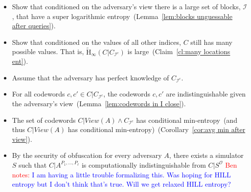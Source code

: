 \documentclass[11pt]{article}
\newcommand{\corref}[1]{\mbox{Corollary~\ref{#1}}}
\newcommand{\lemref}[1]{\mbox{Lemma~\ref{#1}}}
\newcommand{\clref}[1]{\mbox{Claim~\ref{#1}}}
\newcommand{\Hav}{\tilde{\mathrm{H}}_\infty}
\newcommand{\authnote}[2]{{\textcolor{red}{\textsf{#1 notes: }\textcolor{blue}{ #2}}\marginpar{\textcolor{red}{\textbf{!!!!!}}}}}
\newcommand{\authnote}[2]{}
\newcommand{\bnote}[1]{{\authnote{Ben}{#1}}}
\begin{document}
\begin{itemize}
\item Show that conditioned on the adversary's view there is a large set of blocks, $\mathcal{I}$, that have a super logarithmic entropy~(\lemref{lem:blocks unguessable after queries}).
\item Show that conditioned on the values of all other indices, $C$ still has many possible values.  That is, $\Hav(C | C_{\mathcal{I}^c})$ is large~(\clref{cl:many locations ent}).
\item Assume that the adversary has perfect knowledge of $C_{\mathcal{I}^c}$.
\item For all codewords $c, c' \in C| C_{\mathcal{I}^c}$, the codewords $c, c'$ are indistinguishable given the adversary's view~(\lemref{lem:codewords in I close}).
\item The set of codewords $C| View(A) \wedge C_{\mathcal{I}^c}$ has conditional min-entropy~(and thus $C|View(A)$ has conditional min-entropy)~(\corref{cor:avg min after view}).  
\item By the security of obfuscation for every adversary $A$, there exists a simulator $S$ such that $C | A^{P_1,..., P_\ell}$ is computationally indistinguishable from $C | S^{\mathcal{O}}$%
\bnote{I am having a little trouble formalizing this.  Was hoping for HILL entropy but I don't think that's true.  Will we get relaxed HILL entropy?}
\end{itemize}
\end{document}
